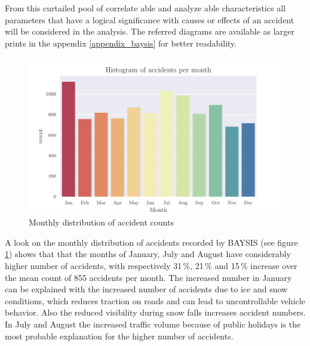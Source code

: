 \documentclass[a4paper,headsepline,footsepline,fontsize=11pt,BCOR=12mm,DIV=12]{report}
\begin{document}
From this curtailed pool of correlate able and analyze able characteristics all parameters that have a logical significance with causes or effects of an accident will be considered in the analysis.  The referred diagrams are available as larger prints in the appendix \ref{appendix_baysis} for better readability. 

\begin{figure}[H]
	\centering
	\includegraphics[scale=0.8]{../CorrAnalysis/data/BAYSIS/01_dataset/plots/baysis_dataset_hist_month}
	\caption{Monthly distribution of accident counts}
	\label{img:baysis_dataset_dist_month}
\end{figure}

A look on the monthly distribution of accidents recorded by BAYSIS (see figure \ref{img:baysis_dataset_dist_month}) shows that that the months of January, July and August have considerably higher number of accidents, with respectively 31\,\%, 21\,\% and 15\,\% increase over the mean count of 855 accidents per month. The increased number in January can be explained with the increased number of accidents due to ice and snow conditions, which reduces traction on roads and can lead to uncontrollable vehicle behavior. Also the reduced visibility during snow falls increases accident numbers. In July and August the increased traffic volume because of public holidays is the most probable explanation for the higher number of accidents.
\end{document}
